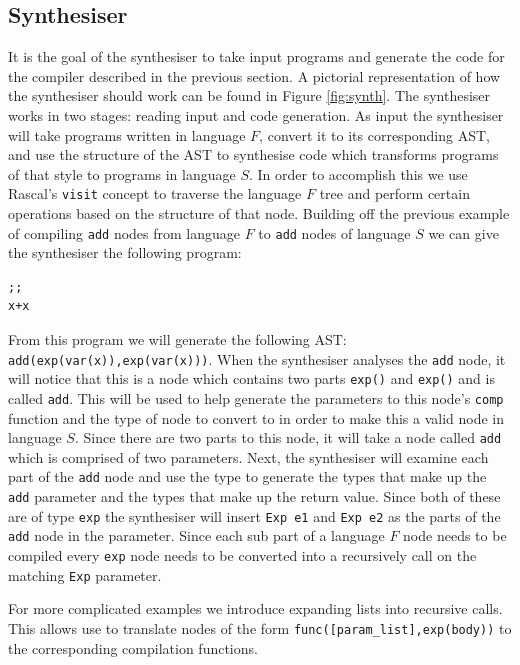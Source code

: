 \documentclass[twoside]{article}
\begin{document}
\subsection{Synthesiser}
It is the goal of the synthesiser to take input programs and generate
the code for the compiler described in the previous section. A
pictorial representation of how the synthesiser should work can be
found in Figure \ref{fig:synth}. The synthesiser works in two stages:
reading input and code generation. As input the synthesiser will take
programs written in language $F$, convert it to its corresponding AST,
and use the structure of the AST to synthesise code which transforms
programs of that style to programs in language $S$. In order to
accomplish this we use Rascal's \texttt{visit} concept to traverse the
language $F$ tree and perform certain operations based on the
structure of that node. Building off the previous example of compiling
\texttt{add} nodes from language $F$ to \texttt{add} nodes of language
$S$ we can give the synthesiser the following program:

\lstset{language=ML}
\begin{lstlisting}
;;
x+x
\end{lstlisting}
From this program we will generate the following AST:
\texttt{add(exp(var(x)),exp(var(x)))}. When the synthesiser analyses
the \texttt{add} node, it will notice that this is a node which
contains two parts \texttt{exp()} and \texttt{exp()} and is called
\texttt{add}. This will be used to help generate the parameters to
this node's \texttt{comp} function and the type of node to convert to
in order to make this a valid node in language $S$. Since there are
two parts to this node, it will take a node called \texttt{add} which
is comprised of two parameters. Next, the synthesiser will examine
each part of the \texttt{add} node and use the type to generate the
types that make up the \texttt{add} parameter and the types that make
up the return value. Since both of these are of type \texttt{exp} the
synthesiser will insert \texttt{Exp e1} and \texttt{Exp e2} as the
parts of the \texttt{add} node in the parameter. Since each sub part
of a language $F$ node needs to be compiled every \texttt{exp} node
needs to be converted into a recursively call on the matching
\texttt{Exp} parameter.

For more complicated examples we introduce expanding lists into
recursive calls. This allows use to translate nodes of the form
\texttt{func([param\_list],exp(body))} to the corresponding
compilation functions.  
\end{document}
